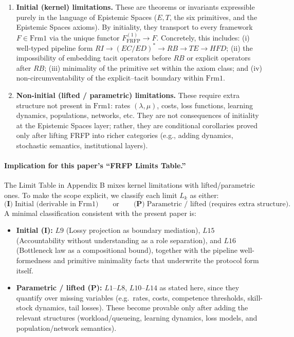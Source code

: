 \begin{enumerate}
\item \textbf{Initial (kernel) limitations.}
These are theorems or invariants expressible purely in the language of Epistemic Spaces
(\(E,T\), the six primitives, and the Epistemic Spaces axioms). By initiality, they transport to every
framework \(F \in \mathrm{Frm1}\) via the unique functor \(F^{(1)}_{\mathrm{FRFP}} \to F\). Concretely, this includes:
(i) well-typed pipeline form \(RI \to (EC/ED)^\ast \to RB \to TE \to HFD\);
(ii) the impossibility of embedding tacit operators before \(RB\) or explicit operators after \(RB\);
(iii) minimality of the primitive set within the axiom class; and
(iv) non-circumventability of the explicit--tacit boundary within \(\mathrm{Frm1}\). \cite{Nadendla2026FRFP}

\item \textbf{Non-initial (lifted / parametric) limitations.}
These require extra structure not present in \(\mathrm{Frm1}\): rates \((\lambda,\mu)\), costs, loss functions,
learning dynamics, populations, networks, etc. They are not consequences of initiality at the Epistemic
Spaces layer; rather, they are conditional corollaries proved only after lifting FRFP into richer
categories (e.g., adding dynamics, stochastic semantics, institutional layers).
\end{enumerate}

\paragraph{Implication for this paper’s “FRFP Limits Table.”}
The Limit Table in Appendix B mixes kernel limitations with lifted/parametric ones. To make the
scope explicit, we classify each limit \(L_k\) as either:
\[
\textbf{(I)}\;\text{Initial (derivable in }\mathrm{Frm1}\text{)} \qquad \text{or} \qquad
\textbf{(P)}\;\text{Parametric / lifted (requires extra structure).}
\]
A minimal classification consistent with the present paper is:

\begin{itemize}
\item \textbf{Initial (I):} \(L9\) (Lossy projection as boundary mediation), \(L15\) (Accountability without understanding as a role separation),
and \(L16\) (Bottleneck law as a compositional bound), together with the pipeline well-formedness and primitive minimality facts
that underwrite the protocol form itself. \cite{Nadendla2026FRFP}
\item \textbf{Parametric / lifted (P):} \(L1\)--\(L8\), \(L10\)--\(L14\) as stated here, since they quantify over missing variables
(e.g.\ rates, costs, competence thresholds, skill-stock dynamics, tail losses). These become provable only after adding the relevant
structures (workload/queueing, learning dynamics, loss models, and population/network semantics).
\end{itemize}

